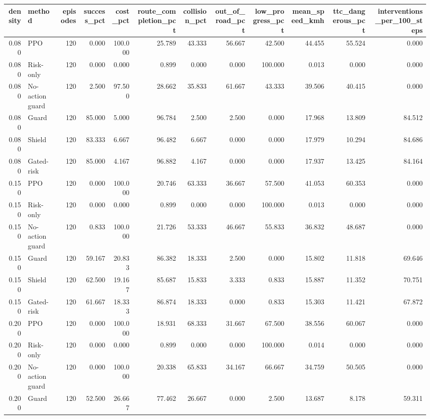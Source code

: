 \begin{tabular}{rlrrrrrrrrrr}
\toprule
density & method & episodes & success\_pct & cost\_pct & route\_completion\_pct & collision\_pct & out\_of\_road\_pct & low\_progress\_pct & mean\_speed\_kmh & ttc\_dangerous\_pct & interventions\_per\_100\_steps \\
\midrule
0.080 & PPO & 120 & 0.000 & 100.000 & 25.789 & 43.333 & 56.667 & 42.500 & 44.455 & 55.524 & 0.000 \\
0.080 & Risk-only & 120 & 0.000 & 0.000 & 0.899 & 0.000 & 0.000 & 100.000 & 0.013 & 0.000 & 0.000 \\
0.080 & No-action guard & 120 & 2.500 & 97.500 & 28.662 & 35.833 & 61.667 & 43.333 & 39.506 & 40.415 & 0.000 \\
0.080 & Guard & 120 & 85.000 & 5.000 & 96.784 & 2.500 & 2.500 & 0.000 & 17.968 & 13.809 & 84.512 \\
0.080 & Shield & 120 & 83.333 & 6.667 & 96.482 & 6.667 & 0.000 & 0.000 & 17.979 & 10.294 & 84.686 \\
0.080 & Gated-risk & 120 & 85.000 & 4.167 & 96.882 & 4.167 & 0.000 & 0.000 & 17.937 & 13.425 & 84.164 \\
0.150 & PPO & 120 & 0.000 & 100.000 & 20.746 & 63.333 & 36.667 & 57.500 & 41.053 & 60.353 & 0.000 \\
0.150 & Risk-only & 120 & 0.000 & 0.000 & 0.899 & 0.000 & 0.000 & 100.000 & 0.013 & 0.000 & 0.000 \\
0.150 & No-action guard & 120 & 0.833 & 100.000 & 21.726 & 53.333 & 46.667 & 55.833 & 36.832 & 48.687 & 0.000 \\
0.150 & Guard & 120 & 59.167 & 20.833 & 86.382 & 18.333 & 2.500 & 0.000 & 15.802 & 11.818 & 69.646 \\
0.150 & Shield & 120 & 62.500 & 19.167 & 85.687 & 15.833 & 3.333 & 0.833 & 15.887 & 11.352 & 70.751 \\
0.150 & Gated-risk & 120 & 61.667 & 18.333 & 86.874 & 18.333 & 0.000 & 0.833 & 15.303 & 11.421 & 67.872 \\
0.200 & PPO & 120 & 0.000 & 100.000 & 18.931 & 68.333 & 31.667 & 67.500 & 38.556 & 60.067 & 0.000 \\
0.200 & Risk-only & 120 & 0.000 & 0.000 & 0.899 & 0.000 & 0.000 & 100.000 & 0.014 & 0.000 & 0.000 \\
0.200 & No-action guard & 120 & 0.000 & 100.000 & 20.338 & 65.833 & 34.167 & 66.667 & 34.759 & 50.505 & 0.000 \\
0.200 & Guard & 120 & 52.500 & 26.667 & 77.462 & 26.667 & 0.000 & 2.500 & 13.687 & 8.178 & 59.311 \\

\end{tabular}
